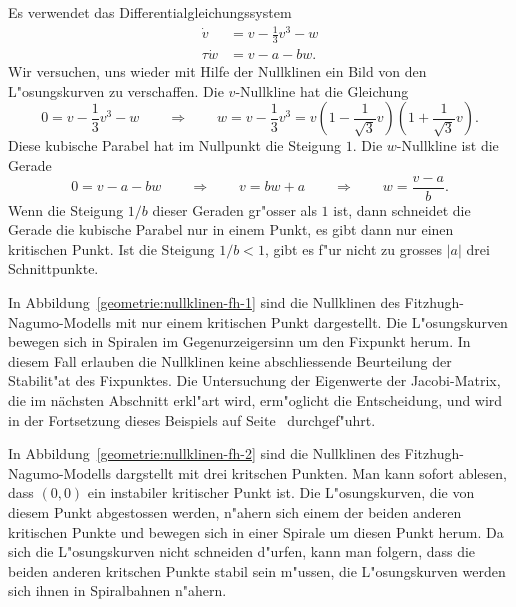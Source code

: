 \begin{beispiel}
\begin{figure}
\end{figure}
Es verwendet das Differentialgleichungssystem
\begin{equation}
\begin{aligned}
    \dot v&= v-\frac13v^3-w\\
\tau\dot w&= v-a-bw.
\end{aligned}
\label{geometrie:fitzhugh-dgl}
\end{equation}
Wir versuchen, uns wieder mit Hilfe der Nullklinen ein Bild von den
L"osungskurven zu verschaffen.
Die $v$-Nullkline hat die Gleichung
\[
0=v-\frac13v^3-w
\qquad\Rightarrow\qquad
w=v-\frac13v^3 = v(1-{\textstyle\frac1{\sqrt{3}}}v)(1+{\textstyle\frac1{\sqrt{3}}}v).
\]
Diese kubische Parabel hat im Nullpunkt die Steigung $1$.
Die $w$-Nullkline ist die Gerade
\[
0=v-a-bw
\qquad\Rightarrow\qquad
v=bw+a
\qquad\Rightarrow\qquad
w = \frac{v-a}{b}.
\]
Wenn die Steigung $1/b$ dieser Geraden gr"osser als $1$ ist, dann schneidet
die Gerade die kubische Parabel nur in einem Punkt, es gibt dann nur
einen kritischen Punkt.
Ist die Steigung $1/b<1$, gibt es f"ur nicht zu grosses $|a|$ drei
Schnittpunkte.

In Abbildung~\ref{geometrie:nullklinen-fh-1} sind die Nullklinen des
Fitzhugh-Nagumo-Modells mit nur einem kritischen Punkt dargestellt.
Die L"osungskurven bewegen sich in Spiralen im Gegenurzeigersinn
um den Fixpunkt herum.
In diesem Fall erlauben die Nullklinen keine abschliessende Beurteilung
der Stabilit"at des Fixpunktes.
Die Untersuchung der Eigenwerte der Jacobi-Matrix, die im nächsten
Abschnitt erkl"art wird, erm"oglicht die Entscheidung, und wird in
der Fortsetzung dieses Beispiels auf Seite~\pageref{geometrie:fh-fortsetzung}
durchgef"uhrt.

In Abbildung~\ref{geometrie:nullklinen-fh-2} sind die Nullklinen des
Fitzhugh-Nagumo-Modells dargstellt mit drei kritschen Punkten.
Man kann sofort ablesen, dass $(0,0)$ ein instabiler kritischer Punkt ist.
Die L"osungskurven, die von diesem Punkt abgestossen werden, n"ahern sich
einem der beiden anderen kritischen Punkte und bewegen sich
in einer Spirale um diesen Punkt herum.
Da sich die L"osungskurven nicht schneiden d"urfen, kann man folgern,
dass die beiden anderen kritschen Punkte stabil sein m"ussen,
die L"osungskurven werden sich ihnen in Spiralbahnen n"ahern.
\label{geometrie:fh-diskussion}
\end{beispiel}

%
%
